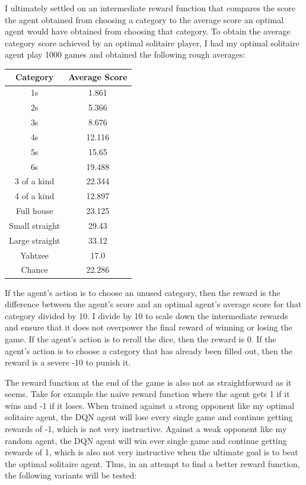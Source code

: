 \documentclass[12pt]{article}
\begin{document}
I ultimately settled on an intermediate reward function that compares the score the agent obtained from choosing a category to the average score an optimal agent would have obtained from choosing that category. To obtain the average category score achieved by an optimal solitaire player, I had my optimal solitaire agent play 1000 games and obtained the following rough averages:

\begin{center}
    \begin{tabular}{ |c|c| }
        \hline
        Category & Average Score \\
        \hline
        1s & 1.861 \\
        2s & 5.366 \\
        3s & 8.676 \\
        4s & 12.116 \\
        5s & 15.65 \\
        6s & 19.488 \\
        3 of a kind & 22.344 \\
        4 of a kind & 12.897 \\
        Full house & 23.125 \\
        Small straight & 29.43 \\
        Large straight & 33.12 \\
        Yahtzee & 17.0 \\
        Chance & 22.286 \\
        \hline
    \end{tabular}
\end{center} 

\noindent
If the agent's action is to choose an unused category, then the reward is the difference between the agent's score and an optimal agent's average score for that category divided by 10. I divide by 10 to scale down the intermediate rewards and ensure that it does not overpower the final reward of winning or losing the game. If the agent's action is to reroll the dice, then the reward is 0. If the agent's action is to choose a category that has already been filled out, then the reward is a severe -10 to punish it.

The reward function at the end of the game is also not as straightforward as it seems. Take for example the naive reward function where the agent gets 1 if it wins and -1 if it loses. When trained against a strong opponent like my optimal solitaire agent, the DQN agent will lose every single game and continue getting rewards of -1, which is not very instructive. Against a weak opponent like my random agent, the DQN agent will win ever single game and continue getting rewards of 1, which is also not very instructive when the ultimate goal is to beat the optimal solitaire agent. Thus, in an attempt to find a better reward function, the following variants will be tested:
\end{document}
